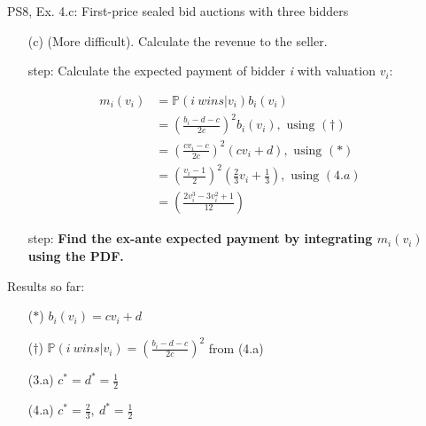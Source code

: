 \begin{frame}{PS8, Ex. 4.c: First-price sealed bid auctions with three bidders}
    \begin{itemize}
      \item[(c)] (More difficult). Calculate the revenue to the seller.
    \end{itemize}
    \vspace{-8pt}
    \begin{multicols}{2}
      \begin{itemize}
        \item[\nth{1} step:] Calculate the expected payment of bidder \textit{i} with valuation $v_i$:
      \end{itemize}
      \vspace{-10pt}
      \begin{align*}
        m_i(v_i)&=\mathbb{P}(i\ wins|v_i)b_i(v_i)\\
                &=\left(\frac{b_i-d-c}{2c}\right)^2b_i(v_i),\text{ using }(\dagger)\\
                &=\left(\frac{cv_i-c}{2c}\right)^2(cv_i+d),\text{ using }(*)\\
                &=\left(\frac{v_i-1}{2}\right)^2\left(\frac{2}{3}v_i+\frac{1}{3}\right),\text{ using }(4.a)\\
                &=\left(\frac{2v_i^3-3v_i^2+1}{12}\right)
      \end{align*}
      \vspace{-10pt}
      \begin{itemize}
        \item[\nth{2} step:] \textbf{Find the ex-ante expected payment by integrating $m_i(v_i)$ using the PDF.}
      \end{itemize}
      \vfill\null\columnbreak
      Results so far:
      \vspace{-6pt}
      \begin{itemize}
        \item[($*$)] $b_i(v_i) = cv_i+d$
        \item[($\dagger$)] $\mathbb{P}(i\ wins|v_i)=\left(\frac{b_i-d-c}{2c}\right)^2$ from (4.a)
        \item[(3.a)] $c^*=d^*=\frac{1}{2}$
        \item[(4.a)] $c^*=\frac{2}{3},\ d^*=\frac{1}{2}$
      \end{itemize}
      \vfill\null
    \end{multicols}
    \vfill\null
\end{frame}
